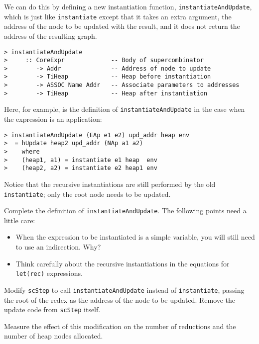 We can do this by defining a new instantiation function, 
\mbox{\tt instantiateAndUpdate},
which is just like
\mbox{\tt instantiate} except that it takes an extra argument,
the address of the node to be updated with the result, and it does
not return the address of the resulting graph.
\begin{verbatim}
> instantiateAndUpdate 
>     :: CoreExpr             -- Body of supercombinator
>        -> Addr              -- Address of node to update
>        -> TiHeap            -- Heap before instantiation
>        -> ASSOC Name Addr   -- Associate parameters to addresses
>        -> TiHeap            -- Heap after instantiation
\end{verbatim}
%
\par
Here, for example, is the definition of \mbox{\tt instantiateAndUpdate} in the
case
when the expression is an application:
\begin{verbatim}
> instantiateAndUpdate (EAp e1 e2) upd_addr heap env
>  = hUpdate heap2 upd_addr (NAp a1 a2)
>    where
>    (heap1, a1) = instantiate e1 heap  env
>    (heap2, a2) = instantiate e2 heap1 env
\end{verbatim}
%
Notice that the recursive instantiations are still performed by the old
\mbox{\tt instantiate}; only the root node needs to be updated.
\begin{exercise}
Complete the definition of \mbox{\tt instantiateAndUpdate}. The following
points need a little care:
\begin{itemize}
\item
When the expression to be instantiated is a simple variable,
you will still need to use an indirection.
Why?
\item
Think carefully about the recursive instantiations in the equations for
\mbox{\tt let(rec)} expressions.
\end{itemize}

Modify \mbox{\tt scStep}
to call \mbox{\tt instantiateAndUpdate} instead of \mbox{\tt instantiate}, passing
the root of the redex as the address of the node to be updated.
Remove the update code from \mbox{\tt scStep} itself.

Measure the effect of this modification on the number of reductions and
the number of heap nodes allocated.
\end{exercise}

